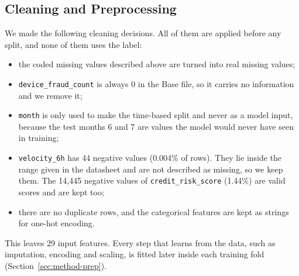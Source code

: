 \subsection{Cleaning and Preprocessing}

We made the following cleaning decisions. All of them are applied before any split, and none of them
uses the label:
\begin{itemize}
  \item the coded missing values described above are turned into real missing values;
  \item \texttt{device\_fraud\_count} is always 0 in the Base file, so it carries no information and
        we remove it;
  \item \texttt{month} is only used to make the time-based split and never as a model input, because
        the test months 6 and 7 are values the model would never have seen in training;
  \item \texttt{velocity\_6h} has 44 negative values (0.004\% of rows). They lie inside the range
        given in the datasheet and are not described as missing, so we keep them. The 14{,}445
        negative values of \texttt{credit\_risk\_score} (1.44\%) are valid scores and are kept too;
  \item there are no duplicate rows, and the categorical features are kept as strings for one-hot
        encoding.
\end{itemize}
This leaves 29 input features. Every step that learns from the data, such as imputation, encoding
and scaling, is fitted later inside each training fold (Section~\ref{sec:method-prep}).
